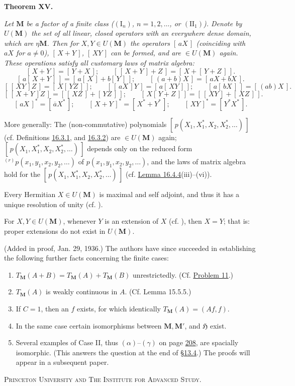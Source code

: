 \documentclass[12pt,b5paper,twoside]{article}
\newcommand{\Hspace}{\mathfrak H}
\newcommand{\M}{\mathbf M}
\newcommand{\clos}[1]{[\,#1\,]}
\newcommand{\MainTheorem}[1]{%
  \par\smallskip\noindent\phantomsection\label{thm:#1}\textbf{Theorem #1.}\enspace
}
\newcommand{\secref}[1]{\hyperref[sec:#1]{\S#1}}
\newcommand{\lemref}[1]{\hyperref[lem:#1]{Lemma #1}}
\newcommand{\probref}[1]{\hyperref[prob:#1]{Problem #1}}
\begin{document}
\MainTheorem{XV}
{\itshape Let \(\M\) be a factor of a finite class
(\((\mathrm I_n)\), \(n=1,2,\ldots\), or \((\mathrm{II}_1)\)). Denote by
\(U(\M)\) the set of all linear, closed operators with an everywhere dense
domain, which are \(\mathbin\eta\M\). Then for \(X,Y\in U(\M)\) the
operators \(\clos{aX}\) (coinciding with \(aX\) for \(a\ne0\)),
\(\clos{X+Y}\), \(\clos{XY}\) can be formed, and are \(\in U(\M)\) again.
These operations satisfy all customary laws of matrix algebra:
\[
\clos{X+Y}=\clos{Y+X};\qquad
\clos{\clos{X+Y}+Z}=\clos{X+\clos{Y+Z}}.
\]
\[
\clos{a\clos{X+Y}}=\clos{a\clos X+b\clos Y};\qquad
\clos{(a+b)X}=\clos{aX+bX}.
\]
\[
\clos{\clos{XY}Z}=\clos{X\clos{YZ}};\qquad
\clos{\clos{aX}Y}=\clos{a\clos{XY}};\qquad
\clos{a\clos{bX}}=\clos{(ab)X}.
\]
\[
\clos{\clos{X+Y}Z}=\clos{\clos{XZ}+\clos{YZ}};\qquad
\clos{X\clos{Y+Z}}=\clos{\clos{XY}+\clos{XZ}}.
\]
\[
\clos{aX}^{*}=\clos{\overline aX^*};\qquad
\clos{X+Y}^{*}=\clos{X^*+Y^*};\qquad
\clos{XY}^{*}=\clos{Y^*X^*}.
\]

More generally: The (non-commutative) polynomials
\(\clos{p(X_1,X_1^*,X_2,X_2^*,\ldots)}\)
(cf. Definitions \hyperref[def:16.3.1]{16.3.1}, and
\hyperref[def:16.3.2]{16.3.2}) are \(\in U(\M)\) again;
\(\clos{p(X_1,X_1^*,X_2,X_2^*,\ldots)}\)
depends only on the reduced form
\({}^{(r)}p(x_1,y_1,x_2,y_2,\ldots)\) of
\(p(x_1,y_1,x_2,y_2,\ldots)\), and the laws of matrix algebra hold for the
\(\clos{p(X_1,X_1^*,X_2,X_2^*,\ldots)}\)
(cf. \lemref{16.4.4}(iii)--(vi)).

Every Hermitian \(X\in U(\M)\) is maximal and self adjoint, and thus it has
a unique resolution of unity (cf. \cite[p.~92]{ref15}).

For \(X,Y\in U(\M)\), whenever \(Y\) is an extension of \(X\) (cf.
\cite[p.~70]{ref15}), then \(X=Y\); that is: proper extensions do not exist
in \(U(\M)\).}

\medskip
\noindent(Added in proof, Jan. 29, 1936.) The authors have since succeeded
in establishing the following further facts concerning the finite cases:
\begin{enumerate}[label=(\roman*)]
\item \(T_{\M}(A+B)=T_{\M}(A)+T_{\M}(B)\) unrestrictedly.
  (Cf. \probref{11}.)
\item \(T_{\M}(A)\) is weakly continuous in \(A\).
  (Cf. Lemma 15.5.5.)
\item If \(C=1\), then an \(f\) exists, for which identically
  \(T_{\M}(A)=(Af,f)\).
\item In the same case certain isomorphisms between \(\M,\M'\), and
  \(\Hspace\) exist.
\item Several examples of Case II, thus \((\alpha)\)--\((\gamma)\) on page
  \hyperref[examples:13.2]{208}, are spacially
  isomorphic. (This answers the question at the end of \secref{13.4}.) The
  proofs will appear in a subsequent paper.
\end{enumerate}

\begin{center}
\textsc{Princeton University and The Institute for Advanced Study.}
\end{center}
\end{document}
